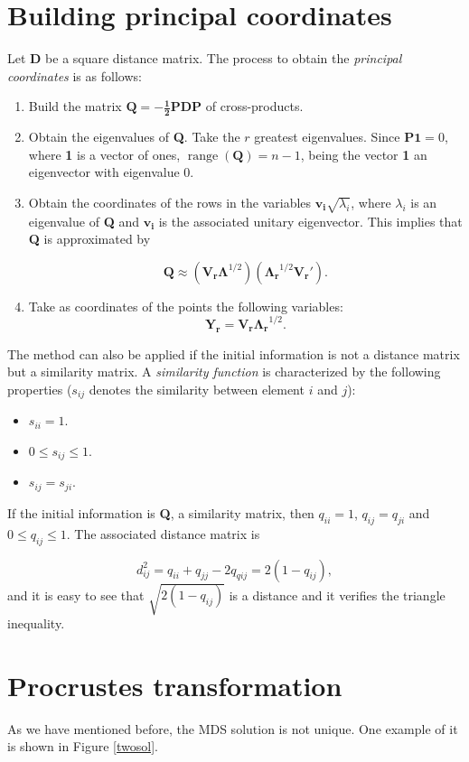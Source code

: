 \documentclass[11pt]{report}
\DeclareMathOperator{\range}{range}
\begin{document}
\section{Building principal coordinates}
Let \textbf{D} be a square distance matrix. The process to obtain 
the \textit{principal coordinates} is as follows:

\begin{enumerate}
\item Build the matrix $\mathbf{Q = - \frac{1}{2} PDP}$ of cross-products.
\item Obtain the eigenvalues of \textbf{Q}. Take the $r$ greatest eigenvalues. 
Since $\mathbf{P1}=0$, where \textbf{1} is a vector of ones, 
$\range(\mathbf{Q})=n-1$, being the vector \textbf{1} an eigenvector with 
eigenvalue 0. 
\item Obtain the coordinates of the rows in the variables 
$\mathbf{v_i}\sqrt{\lambda_i}$,
where $\lambda_i$ is an eigenvalue of \textbf{Q} and $\mathbf{v_i}$ is the
associated unitary eigenvector. This implies that \textbf{Q} is approximated by

\[
\mathbf{Q} \approx (\mathbf{V_r \Lambda}^{1/2})(\mathbf{\Lambda_r}^{1/2} \mathbf{V_r'}).
\]

\item Take as coordinates of the points the following variables:
\[
\mathbf{Y_r} = \mathbf{V_r}\mathbf{\Lambda_r}^{1/2}.
\]
\end{enumerate}

\indent The method can also be applied if the initial information is not a 
distance matrix but a similarity matrix. A \textit{similarity function} 
is characterized by the following properties ($s_{ij}$ denotes the
similarity between element $i$ and $j$):


\begin{itemize}
\item $s_{ii} = 1$.
\item $0 \leq s_{ij} \leq 1$.
\item $s_{ij} = s_{ji}$.
\end{itemize}

If the initial information is \textbf{Q}, a similarity matrix, then $q_{ii} = 1$,
$q_{ij} = q_{ji}$ and $0 \leq q_{ij} \leq 1$. The associated distance matrix 
is

\[
d_{ij}^2 = q_{ii} + q_{jj} - 2q_{qij} = 2(1-q_{ij}),
\]
and it is easy to see that $\sqrt{2(1-q_{ij})}$ is a distance and it verifies
the triangle inequality.


\section{Procrustes transformation}
As we have mentioned before, the MDS solution is not unique. One example of it 
is shown in Figure \ref{twosol}.
\end{document}
